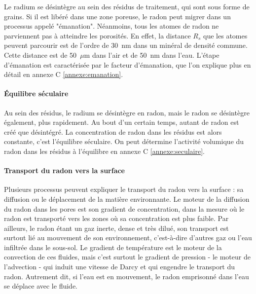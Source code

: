 \documentclass{article}
\begin{document}
Le radium se désintègre au sein des résidus de traitement, qui sont sous forme de grains. Si il est libéré dans une zone poreuse, le radon peut migrer dans un processus appelé "émanation".  Néanmoins, tous les atomes de radon ne parviennent pas à atteindre les porosités. En effet, la distance $R_s$ que les atomes peuvent parcourir est de l’ordre de 30~nm dans un minéral de densité commune. Cette distance est de 50~$\mu$m dans l’air et de 50~nm dans l’eau. L'étape d'émanation est caractérisée par le facteur d'émanation, que l'on explique plus en détail en annexe C \ref{annexe:emanation}.

\paragraph{Équilibre séculaire} Au sein des résidus, le radium se désintègre en radon, mais le radon se désintègre également, plus rapidement. Au bout d’un certain temps, autant de radon est créé que désintégré. La concentration de radon dans les résidus est alors constante, c’est l’équilibre séculaire. On peut détermine l'activité volumique du radon dans les résidus à l'équilibre en annexe C \ref{annexe:seculaire}.

\paragraph{Transport du radon vers la surface} Plusieurs processus peuvent expliquer le transport du radon vers la surface \cite{irsn_ineris_radon_nodate} : sa diffusion ou le déplacement de la matière environnante. Le moteur de la diffusion du radon dans les pores est son gradient de concentration, dans la mesure où le radon est transporté vers les zones où sa concentration est plus faible. Par ailleurs, le radon étant un gaz inerte, dense et très dilué, son transport est surtout lié au mouvement de son environnement, c’est-à-dire d’autres gaz ou l’eau infiltrée dans le sous-sol. Le gradient de température est le moteur de la convection de ces fluides, mais c’est surtout le gradient de pression - le moteur de l’advection - qui induit une vitesse de Darcy et qui engendre le transport du radon. Autrement dit, si l’eau est en mouvement, le radon emprisonné dans l’eau se déplace avec le fluide.
\end{document}
